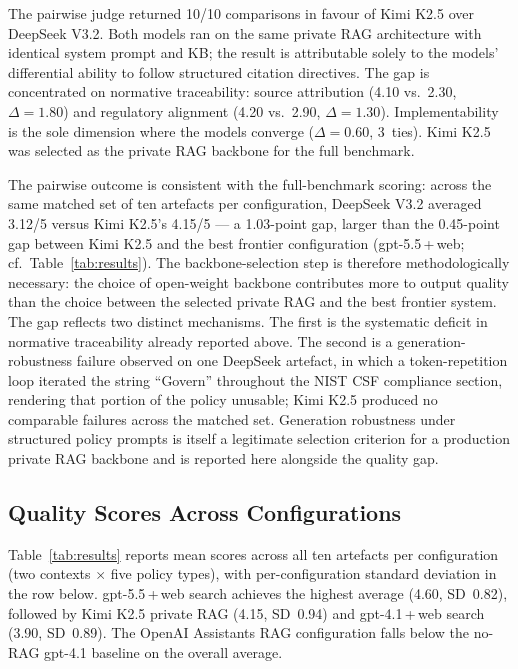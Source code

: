 \documentclass[runningheads]{llncs}
\begin{document}
The pairwise judge returned 10/10 comparisons in favour of Kimi K2.5
over DeepSeek V3.2. Both models ran on the same private RAG architecture
with identical system prompt and KB; the result is attributable solely to
the models' differential ability to follow structured citation directives.
The gap is concentrated on normative traceability: source attribution
(4.10 vs.\ 2.30, $\Delta = 1.80$) and regulatory alignment
(4.20 vs.\ 2.90, $\Delta = 1.30$). Implementability is the sole dimension
where the models converge ($\Delta = 0.60$, 3~ties). Kimi K2.5 was
selected as the private RAG backbone for the full benchmark.

The pairwise outcome is consistent with the full-benchmark scoring:
across the same matched set of ten artefacts per configuration, DeepSeek
V3.2 averaged 3.12/5 versus Kimi K2.5's 4.15/5 --- a 1.03-point gap,
larger than the 0.45-point gap between Kimi K2.5 and the best frontier
configuration (gpt-5.5\,+\,web; cf.\ Table~\ref{tab:results}). The
backbone-selection step is therefore methodologically necessary: the
choice of open-weight backbone contributes more to output quality than
the choice between the selected private RAG and the best frontier system.
The gap reflects two distinct mechanisms. The first is the systematic
deficit in normative traceability already reported above. The second is
a generation-robustness failure observed on one DeepSeek artefact, in
which a token-repetition loop iterated the string ``Govern'' throughout
the NIST CSF compliance section, rendering that portion of the policy
unusable; Kimi K2.5 produced no comparable failures across the matched
set. Generation robustness under structured policy prompts is itself a
legitimate selection criterion for a production private RAG backbone and
is reported here alongside the quality gap.

\subsection{Quality Scores Across Configurations}

Table~\ref{tab:results} reports mean scores across all ten artefacts per
configuration (two contexts $\times$ five policy types), with
per-configuration standard deviation in the row below.
gpt-5.5\,+\,web search achieves the highest average
(4.60, SD~0.82), followed by Kimi K2.5 private RAG (4.15, SD~0.94)
and gpt-4.1\,+\,web search (3.90, SD~0.89).
The OpenAI Assistants RAG configuration falls below the no-RAG gpt-4.1
baseline on the overall average.
\end{document}

